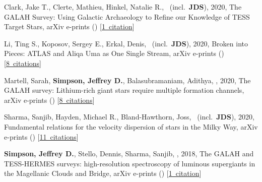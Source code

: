 \item[{\color{numcolor}\scriptsize5}] Clark, Jake T., Clerte, Mathieu, Hinkel, Natalie R., \etal\ (incl.\ \textbf{JDS}), 2020, The GALAH Survey: Using Galactic Archaeology to Refine our Knowledge of TESS Target Stars, arXiv e-prints () [\href{https://ui.adsabs.harvard.edu/#abs/2020arXiv200805372C}{1~citation}]

\item[{\color{numcolor}\scriptsize4}] Li, Ting S., Koposov, Sergey E., Erkal, Denis, \etal\ (incl.\ \textbf{JDS}), 2020, Broken into Pieces: ATLAS and Aliqa Uma as One Single Stream, arXiv e-prints () [\href{https://ui.adsabs.harvard.edu/#abs/2020arXiv200610763L}{8~citations}]

\item[{\color{numcolor}\scriptsize3}] Martell, Sarah, \textbf{Simpson, Jeffrey D.}, Balasubramaniam, Adithya, \etal, 2020, The GALAH survey: Lithium-rich giant stars require multiple formation channels, arXiv e-prints () [\href{https://ui.adsabs.harvard.edu/#abs/2020arXiv200602106M}{8~citations}]

\item[{\color{numcolor}\scriptsize2}] Sharma, Sanjib, Hayden, Michael R., Bland-Hawthorn, Joss, \etal\ (incl.\ \textbf{JDS}), 2020, Fundamental relations for the velocity dispersion of stars in the Milky Way, arXiv e-prints () [\href{https://ui.adsabs.harvard.edu/#abs/2020arXiv200406556S}{11~citations}]

\item[{\color{numcolor}\scriptsize1}] \textbf{Simpson, Jeffrey D.}, Stello, Dennis, Sharma, Sanjib, \etal, 2018, The GALAH and TESS-HERMES surveys: high-resolution spectroscopy of luminous supergiants in the Magellanic Clouds and Bridge, arXiv e-prints () [\href{https://ui.adsabs.harvard.edu/#abs/2018arXiv180405900S}{1~citation}]
